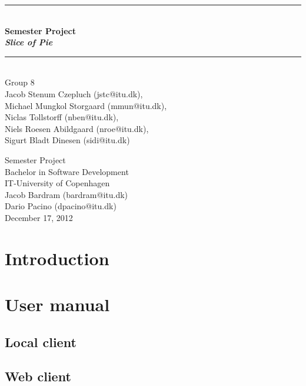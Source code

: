 \documentclass[a4paper,11pt]{article}
\begin{document}
\begin{titlepage}
\centering \parindent=0pt
\newcommand{\HRule}{\rule{\textwidth}{1mm}}
 \HRule\\[1cm]\Huge\bfseries
Semester Project\\\emph{Slice of Pie}\\[0.7cm]
\HRule\\[4cm]  \large Group 8
\\Jacob Stenum Czepluch (jstc@itu.dk), 
\\Michael Mungkol Storgaard (mmun@itu.dk),
\\Niclas Tollstorff (nben@itu.dk), 
\\Niels Roesen Abildgaard (nroe@itu.dk), 
\\Sigurt Bladt Dinesen (sidi@itu.dk) \\

 \normalsize %
\begin{flushleft}
Semester Project\\
Bachelor in Software Development\\
IT-University of Copenhagen\\
Jacob Bardram (bardram@itu.dk)\\
Dario Pacino (dpacino@itu.dk) \\
December 17, 2012 \end{flushleft}
\end{titlepage}

\tableofcontents
\pagebreak

\pagebreak
\section{Introduction}


\pagebreak
\section{User manual}


\subsection{Local client}


\subsection{Web client}

\end{document}
